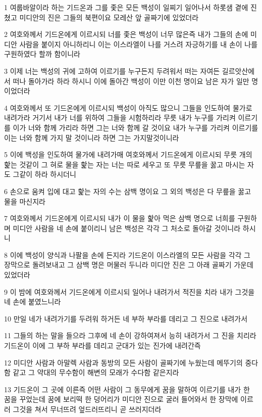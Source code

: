 \par 1 여룹바알이라 하는 기드온과 그를 좇은 모든 백성이 일찌기 일어나서 하롯샘 곁에 진 쳤고 미디안의 진은 그들의 북편이요 모레산 앞 골짜기에 있었더라
\par 2 여호와께서 기드온에게 이르시되 너를 좇은 백성이 너무 많은즉 내가 그들의 손에 미디안 사람을 붙이지 아니하리니 이는 이스라엘이 나를 거스려 자긍하기를 내 손이 나를 구원하였다 할까 함이니라
\par 3 이제 너는 백성의 귀에 고하여 이르기를 누구든지 두려워서 떠는 자여든 길르앗산에서 떠나 돌아가라 하라 하시니 이에 돌아간 백성이 이만 이천 명이요 남은 자가 일만 명이었더라
\par 4 여호와께서 또 기드온에게 이르시되 백성이 아직도 많으니 그들을 인도하여 물가로 내려가라 거기서 내가 너를 위하여 그들을 시험하리라 무릇 내가 누구를 가리켜 이르기를 이가 너와 함께 가리라 하면 그는 너와 함께 갈 것이요 내가 누구를 가리켜 이르기를 이는 너와 함께 가지 말 것이니라 하면 그는 가지말것이니라
\par 5 이에 백성을 인도하여 물가에 내려가매 여호와께서 기드온에게 이르시되 무릇 개의 핥는 것같이 그 혀로 물을 핥는 자는 너는 따로 세우고 또 무릇 무릎을 꿇고 마시는 자도 그같이 하라 하시더니
\par 6 손으로 움켜 입에 대고 핥는 자의 수는 삼백 명이요 그 외의 백성은 다 무릎을 꿇고 물을 마신지라
\par 7 여호와께서 기드온에게 이르시되 내가 이 물을 핥아 먹은 삼백 명으로 너희를 구원하며 미디안 사람을 네 손에 붙이리니 남은 백성은 각각 그 처소로 돌아갈 것이니라 하시니
\par 8 이에 백성이 양식과 나팔을 손에 든지라 기드온이 이스라엘의 모든 사람을 각각 그 장막으로 돌려보내고 그 삼백 명은 머물러 두니라 미디안 진은 그 아래 골짜기 가운데 있었더라
\par 9 이 밤에 여호와께서 기드온에게 이르시되 일어나 내려가서 적진을 치라 내가 그것을 네 손에 붙였느니라
\par 10 만일 네가 내려가기를 두려워 하거든 네 부하 부라를 데리고 그 진으로 내려가서
\par 11 그들의 하는 말을 들으라 그후에 네 손이 강하여져서 능히 내려가서 그 진을 치리라 기드온이 이에 그 부하 부라를 데리고 군대가 있는 진가에 내려간즉
\par 12 미디안 사람과 아말렉 사람과 동방의 모든 사람이 골짜기에 누웠는데 메뚜기의 중다함 같고 그 약대의 무수함이 해변의 모래가 수다함 같은지라
\par 13 기드온이 그 곳에 이른즉 어떤 사람이 그 동무에게 꿈을 말하여 이르기를 내가 한 꿈을 꾸었는데 꿈에 보리떡 한 덩어리가 미디안 진으로 굴러 들어와서 한 장막에 이르러 그것을 쳐서 무너뜨려 엎드러뜨리니 곧 쓰러지더라
